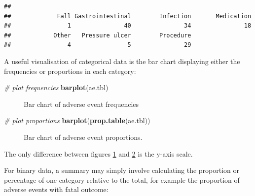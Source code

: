 \documentclass[
]{book}
\makeatletter
\newenvironment{Shaded}{\begin{snugshade}}{\end{snugshade}}
\newcommand{\CommentTok}[1]{\textcolor[rgb]{0.56,0.35,0.01}{\textit{#1}}}
\newcommand{\FunctionTok}[1]{\textcolor[rgb]{0.13,0.29,0.53}{\textbf{#1}}}
\newcommand{\NormalTok}[1]{#1}
\newcommand{\SpecialCharTok}[1]{\textcolor[rgb]{0.81,0.36,0.00}{\textbf{#1}}}
\newcommand{\StringTok}[1]{\textcolor[rgb]{0.31,0.60,0.02}{#1}}
\newcommand*\pandocbounded[1]{%
  \sbox\pandoc@box{#1}%
  \Gscale@div\@tempa{\textheight}{\dimexpr\ht\pandoc@box+\dp\pandoc@box\relax}%
  \Gscale@div\@tempb{\linewidth}{\wd\pandoc@box}%
  \ifdim\@tempb\p@<\@tempa\p@\let\@tempa\@tempb\fi%
  \ifdim\@tempa\p@<\p@\scalebox{\@tempa}{\usebox\pandoc@box}%
  \else\usebox{\pandoc@box}%
  \fi%
}
\makeatother
\begin{document}
\begin{verbatim}
## 
##             Fall Gastrointestinal        Infection       Medication 
##                1               40               34               18 
##            Other   Pressure ulcer        Procedure 
##                4                5               29
\end{verbatim}

A useful visualisation of categorical data is the bar chart displaying either the frequencies or proportions in each category:

\begin{Shaded}
\begin{Highlighting}[]
\CommentTok{\# plot frequencies}
\FunctionTok{barplot}\NormalTok{(ae.tbl)}
\end{Highlighting}
\end{Shaded}

\begin{figure}
\centering
\pandocbounded{}
\caption{\label{fig:stat-bar1}Bar chart of adverse event frequencies}
\end{figure}

\begin{Shaded}
\begin{Highlighting}[]
\CommentTok{\# plot proportions}
\FunctionTok{barplot}\NormalTok{(}\FunctionTok{prop.table}\NormalTok{(ae.tbl))}
\end{Highlighting}
\end{Shaded}

\begin{figure}
\centering
\pandocbounded{}
\caption{\label{fig:stat-bar2}Bar chart of adverse event proportions.}
\end{figure}

The only difference between figures \ref{fig:stat-bar1} and \ref{fig:stat-bar2} is the y-axis scale.

For binary data, a summary may simply involve calculating the proportion or percentage of one category relative to the total, for example the proportion of adverse events with fatal outcome:

\begin{Shaded}
\end{Shaded}
\end{document}

